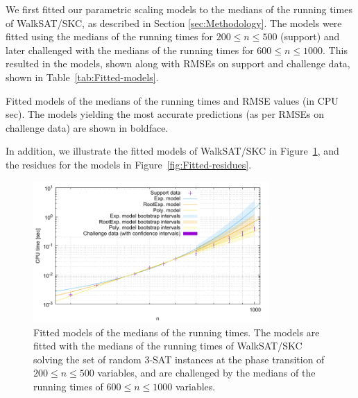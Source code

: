 We first fitted our parametric scaling models to the medians of the  running times
of WalkSAT/SKC, as described in Section \ref{sec:Methodology}. The
models were fitted using the medians of the  running times for $200\leq n\leq 500$
(support) and later challenged with the medians of the  running times for $600\leq n\leq 1000$.
This resulted in the models, shown along with RMSEs on support and
challenge data, shown in Table~\ref{tab:Fitted-models}.
\begin{table}[tb]
\begin{centering}

% 
\par\end{centering}

\caption{\label{tab:Fitted-models}Fitted models of the medians of the  running times and RMSE
values (in CPU sec). The models yielding the most
accurate predictions (as per RMSEs on challenge data) are shown in
boldface.}
\end{table}
In addition, we illustrate the fitted models of WalkSAT/SKC in Figure~\ref{fig:Fitted-models},
and the residues for the models in Figure~\ref{fig:Fitted-residues}.
\begin{figure}[tb]
\noindent \begin{centering}
\includegraphics[width=0.8\textwidth]{fittedModels}
\par\end{centering}

\caption{\label{fig:Fitted-models} Fitted models of the medians of the  running times.
The models are fitted with the medians of the  running times of
WalkSAT/SKC solving the set of random 3-SAT instances at the phase transition
of $200\leq n\leq 500$ variables, and are challenged by the medians of the 
running times of $600\leq n\leq 1000$ variables.}
\end{figure}


